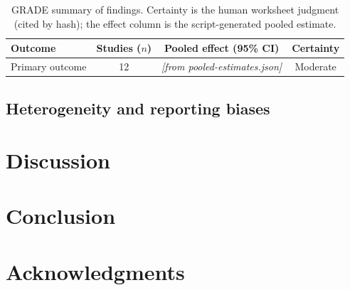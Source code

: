\documentclass[12pt,a4paper]{article}
\newcommand{\prismaIncluded}{12}             %
\begin{document}
\begin{table}[htbp]
\centering
\caption{GRADE summary of findings. Certainty is the human worksheet judgment (cited by hash);
the effect column is the script-generated pooled estimate.}
\label{tab:grade}
\begin{tabular}{@{}l c c c@{}}
\toprule
\textbf{Outcome} & \textbf{Studies ($n$)} & \textbf{Pooled effect (95\% CI)} & \textbf{Certainty} \\
\midrule
Primary outcome   & \prismaIncluded & \textit{[from pooled-estimates.json]} & Moderate \\
\bottomrule
\end{tabular}
\end{table}

\subsection{Heterogeneity and reporting biases}

\section{Discussion}

\section{Conclusion}

\section*{Acknowledgments}

\appendix
\end{document}

